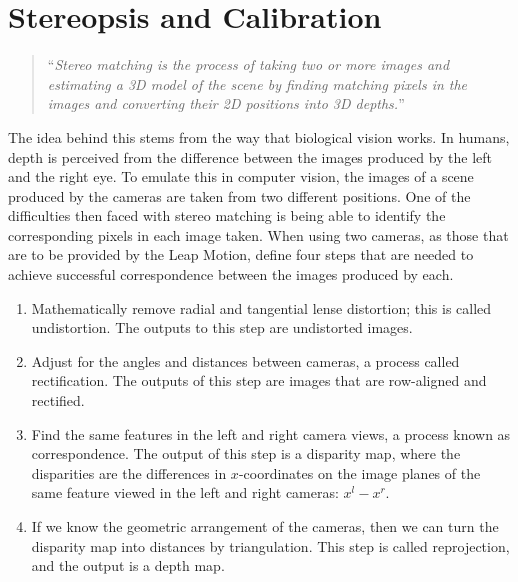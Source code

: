 \documentclass[11pt,oneside]{report}
\begin{document}
			\section{Stereopsis and Calibration}
			\begin{quote}
				``\textit{Stereo matching is the process of taking two or more images and estimating a 3D model of the scene by finding matching pixels in the images and converting their 2D positions into 3D depths.}''\cite{book:sam}
			\end{quote}
			The idea behind this stems from the way that biological vision works.
			In humans, depth is perceived from the difference between the images produced by the left and the right eye.
			To emulate this in computer vision, the images of a scene produced by the cameras are taken from two different positions.
			One of the difficulties then faced with stereo matching is being able to identify the corresponding pixels in each image taken.
			When using two cameras, as those that are to be provided by the Leap Motion,  define four steps that are needed to achieve successful correspondence between the images produced by each.
			
			\begin{enumerate}
				\item Mathematically remove radial and tangential lense distortion; this is called undistortion. The outputs to this step are undistorted images.
				
				\item Adjust for the angles and distances between cameras, a process called rectification. The outputs of this step are images that are row-aligned and rectified.
				
				\item Find the same features in the left and right camera views, a process known as correspondence. The output of this step is a disparity map, where the disparities are the differences in $x$-coordinates on the image planes of the same feature viewed in the left and right cameras: $x^{l} - x^{r}$.
				
				\item If we know the geometric arrangement of the cameras, then we can turn the disparity map into distances by triangulation. This step is called reprojection, and the output is a depth map.
			\end{enumerate}
			
\end{document}
